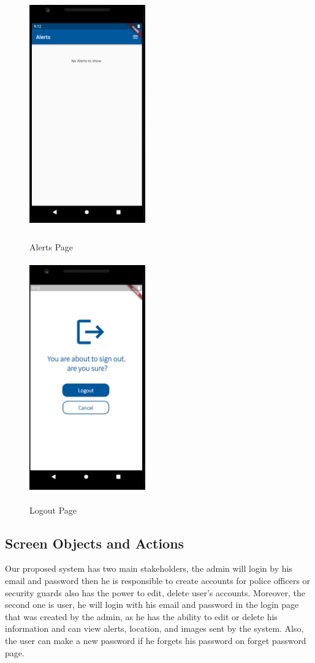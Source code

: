 \documentclass[12pt]{article}
\begin{document}
\begin{figure}[h]
\begin{minipage}[b]{0.5\textwidth}
    \includegraphics[width=5.0cm, height=10.0cm]{Alerts.PNG}
    \caption{Alerts Page}
  \end{minipage}
  \begin{minipage}[b]{0.5\textwidth}
    \includegraphics[width=5.0cm, height=10.0cm]{Logout.PNG}
     \label{fig:2}
   \caption{Logout Page}
  \end{minipage}
  
\label{label1}
\end{figure}

\FloatBarrier

\subsection {Screen Objects and Actions}
Our proposed system has two main stakeholders, the admin will login by his email and password then he is responsible to create accounts for police officers or security guards also has the power to edit, delete user’s accounts. Moreover, the second one is user, he will login with his email and password in the login page that was created by the admin, as he has the ability to edit or delete his information and can view alerts, location, and images sent by the system. Also, the user can make a new password if he forgets his password on forget password page.
\end{document}

